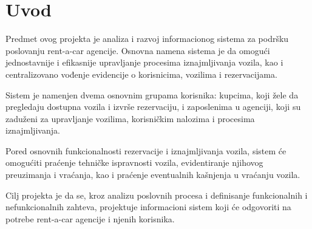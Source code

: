 
\section{Uvod}

Predmet ovog projekta je analiza i razvoj informacionog sistema
za podršku poslovanju rent-a-car agencije. Osnovna namena sistema
je da omogući jednostavnije i efikasnije upravljanje procesima
iznajmljivanja vozila, kao i centralizovano vođenje evidencije o
korisnicima, vozilima i rezervacijama.

Sistem je namenjen dvema osnovnim grupama korisnika:
kupcima, koji žele da pregledaju dostupna vozila i izvrše
rezervaciju, i zaposlenima u agenciji, koji su zaduženi za
upravljanje vozilima, korisničkim nalozima i procesima
iznajmljivanja.

Pored osnovnih funkcionalnosti rezervacije i iznajmljivanja
vozila, sistem će omogućiti praćenje tehničke ispravnosti
vozila, evidentiranje njihovog preuzimanja i vraćanja, kao i
praćenje eventualnih kašnjenja u vraćanju vozila.

Cilj projekta je da se, kroz analizu poslovnih procesa i
definisanje funkcionalnih i nefunkcionalnih zahteva, projektuje
informacioni sistem koji će odgovoriti na potrebe rent-a-car
agencije i njenih korisnika.